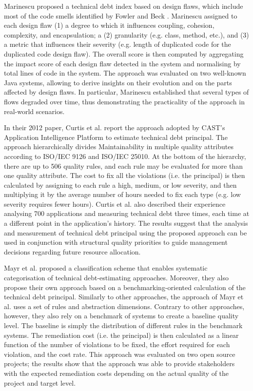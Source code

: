 Marinescu \cite{Marinescu2012} proposed a technical debt index based on design flaws, which include most of the code smells identified by Fowler and Beck \cite{Fowler2002}.
Marinescu assigned to each design flaw (1) a degree to which it influences coupling, cohesion, complexity, and encapsulation; a (2) granularity (e.g. class, method, etc.), and (3) a metric that influences their severity (e.g. length of duplicated code for the duplicated code design flaw).
The overall score is then computed by aggregating the impact score of each design flaw detected in the system and normalising by total lines of code in the system.
The approach was evaluated on two well-known Java systems, allowing to derive insights on their evolution and on the parts affected by design flaws.
In particular, Marinescu established that several types of flows degraded over time, thus demonstrating the practicality of the approach in real-world scenarios.

In their 2012 paper, Curtis et al. \cite{Curtis2012} report the approach adopted by CAST's Application Intelligence Platform to estimate technical debt principal.
The approach hierarchically divides Maintainability in multiple quality attributes according to ISO/IEC 9126 and ISO/IEC 25010.
At the bottom of the hierarchy, there are up to 506 quality rules, and each rule may be evaluated for more than one quality attribute.
The cost to fix all the violations (i.e. the principal) is then calculated by assigning to each rule a high, medium, or low severity, and then multiplying it by the average number of hours needed to fix each type (e.g. low severity requires fewer hours).
Curtis et al. also described their experience analysing 700 applications and measuring technical debt three times, each time at a different point in the application's history.
The results suggest that the analysis and measurement of technical debt principal using the proposed approach can be used in conjunction with structural quality priorities to guide management decisions regarding future resource allocation.

Mayr et al. \cite{Mayr2014} proposed a classification scheme that enables systematic categorisation of technical debt-estimating approaches.
Moreover, they also propose their own approach based on a benchmarking-oriented calculation of the technical debt principal.
Similarly to other approaches, the approach of Mayr et al. uses a set of rules and abstraction dimensions.
Contrary to other approaches, however, they also rely on a benchmark of systems to create a baseline quality level.
The baseline is simply the distribution of different rules in the benchmark systems.
The remediation cost (i.e. the principal) is then calculated as a linear function of the number of violations to be fixed, the effort required for each violation, and the cost rate.
This approach was evaluated on two open source projects; the results show that the approach was able to provide stakeholders with the expected remediation costs depending on the actual quality of the project and target level.

